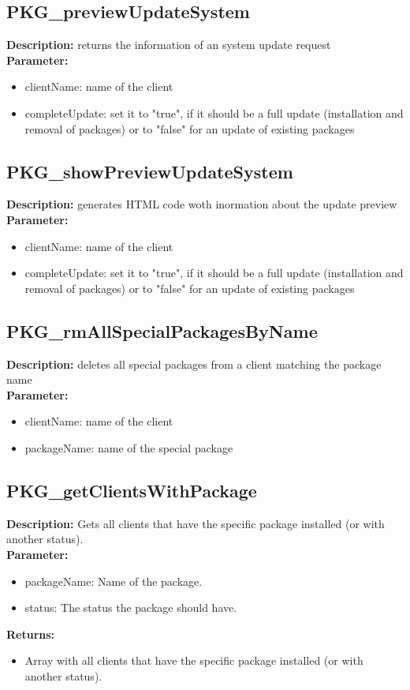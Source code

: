 \subsection{PKG\_previewUpdateSystem}
\textbf{Description:} returns the information of an system update request\\
\textbf{Parameter:}
\begin{itemize}
\item clientName: name of the client 
\item completeUpdate: set it to "true", if it should be a full update (installation and removal of packages) or to "false" for an update of existing packages
\end{itemize}

\subsection{PKG\_showPreviewUpdateSystem}
\textbf{Description:} generates HTML code woth inormation about the update preview\\
\textbf{Parameter:}
\begin{itemize}
\item clientName: name of the client 
\item completeUpdate: set it to "true", if it should be a full update (installation and removal of packages) or to "false" for an update of existing packages
\end{itemize}

\subsection{PKG\_rmAllSpecialPackagesByName}
\textbf{Description:} deletes all special packages from a client matching the package name\\
\textbf{Parameter:}
\begin{itemize}
\item clientName: name of the client 
\item packageName: name of the special package
\end{itemize}

\subsection{PKG\_getClientsWithPackage}
\textbf{Description:} Gets all clients that have the specific package installed (or with another status).\\
\textbf{Parameter:}
\begin{itemize}
\item packageName: Name of the package.
\item status: The status the package should have.
\end{itemize}
\textbf{Returns:}
\begin{itemize}
\item Array with all clients that have the specific package installed (or with another status).
\end{itemize}

